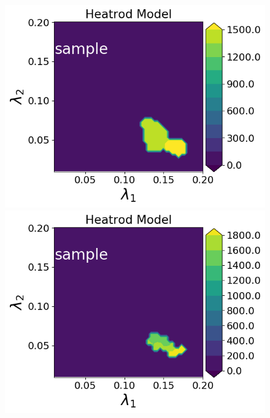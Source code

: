 \begin{figure}
\begin{minipage}{.4\textwidth}
\includegraphics[width=\linewidth]{examples/fig_heatrod_q1/HeatrodModel--sample_N50_mc.png}
\includegraphics[width=\linewidth]{examples/fig_heatrod_q1/HeatrodModel--sample_N500_mc.png}


\end{minipage}
\end{figure}
